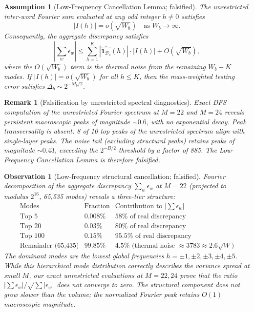 \documentclass[12pt,a4paper]{article}
\newtheorem{remark}[theorem]{Remark}
\newtheorem{assumption}[theorem]{Assumption}
\newtheorem{observation}[theorem]{Observation}
\begin{document}
\begin{assumption}[Low-Frequency Cancellation Lemma; falsified]
\label{ass:low_freq_cancellation}
The unrestricted inter-word Fourier sum evaluated at any odd integer $h \neq 0$
satisfies
\[
|I(h)| = o(\sqrt{W_b}) \quad \text{as } W_b \to \infty.
\]
Consequently, the aggregate discrepancy satisfies
\[
\left|\sum_w \epsilon_w\right| \le \sum_{h=1}^{K} |\widehat{\mathbf{1}_{\mathcal{B}_b}}(h)| \cdot |I(h)| + O(\sqrt{W_b}),
\]
where the $O(\sqrt{W_b})$ term is the thermal noise from the remaining $W_b - K$ modes. If $|I(h)| = o(\sqrt{W_b})$ for all $h \le K$, then the mass-weighted testing error satisfies $\Delta_b \sim 2^{-M_b/2}$.
\end{assumption}

\begin{remark}[Falsification by unrestricted spectral diagnostics]
Exact DFS computation of the unrestricted Fourier spectrum at $M=22$ and
$M=24$ reveals persistent macroscopic peaks of magnitude $\sim 0.6$,
with no exponential decay. Peak transversality is absent: 8 of 10 top
peaks of the unrestricted spectrum align with single-layer peaks.
The noise tail (excluding structural peaks) retains peaks of magnitude
$\sim 0.43$, exceeding the $2^{-B/2}$ threshold by a factor of 885.
The Low-Frequency Cancellation Lemma is therefore falsified.
\end{remark}

\begin{observation}[Low-frequency structural cancellation; falsified]
\label{obs:low_freq_cancellation}
Fourier decomposition of the aggregate discrepancy $\sum_w \epsilon_w$ at
$M=22$ (projected to modulus $2^{16}$, 65,535 modes) reveals a three-tier structure:
\[
\begin{array}{c|c|c}
\text{Modes} & \text{Fraction} & \text{Contribution to } |\sum\epsilon_w| \\ \hline
\text{Top 5} & 0.008\% & 58\% \text{ of real discrepancy} \\
\text{Top 20} & 0.03\% & 80\% \text{ of real discrepancy} \\
\text{Top 100} & 0.15\% & 95.5\% \text{ of real discrepancy} \\
\text{Remainder (65,435)} & 99.85\% & 4.5\% \text{ (thermal noise } \approx 3783 \approx 2.6\sqrt{W}\text{)}
\end{array}
\]
The dominant modes are the lowest global frequencies $h = \pm 1, \pm 2, \pm 3, \pm 4, \pm 5$. While this hierarchical mode distribution correctly describes the variance spread at small $M$, our exact unrestricted evaluations at $M=22, 24$ prove that the ratio $|\sum\epsilon_w|/\sqrt{\sum|\epsilon_w|}$ does not converge to zero. The structural component does not grow slower than the volume; the normalized Fourier peak retains $O(1)$ macroscopic magnitude.
\end{observation}
\end{document}
